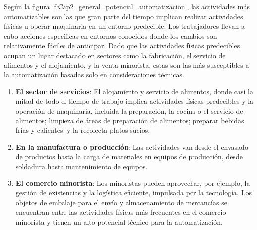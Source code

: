     Según la figura \ref{f:Cap2_general_potencial_automatizacion}, las actividades más automatizables son las que gran parte del tiempo implican realizar actividades físicas u operar maquinaria en un entorno predecible. Los trabajadores llevan a cabo acciones específicas en entornos conocidos donde los cambios son relativamente fáciles de anticipar. Dado que las actividades físicas predecibles ocupan un lugar destacado en sectores como la fabricación, el servicio de alimentos y el alojamiento, y la venta minorista, estas son las más susceptibles a la automatización basadas solo en consideraciones técnicas.
    
    
    \begin{enumerate}
        \item \textbf{El sector de servicios}: El alojamiento y servicio de alimentos, donde casi la mitad de todo el tiempo de trabajo implica actividades físicas predecibles y la operación de maquinaria, incluida la preparación, la cocina o el servicio de alimentos; limpieza de áreas de preparación de alimentos; preparar bebidas frías y calientes; y la recolecta platos sucios. 
        \item \textbf{En la manufactura o producción}: Las actividades van desde el envasado de productos hasta la carga de materiales en equipos de producción, desde soldadura hasta mantenimiento de equipos.
        \item \textbf{El comercio minorista}: Los minoristas pueden aprovechar, por ejemplo, la gestión de existencias y la logística eficiente, impulsada por la tecnología. Los objetos de embalaje para el envío y almacenamiento de mercancías se encuentran entre las actividades físicas más frecuentes en el comercio minorista y tienen un alto potencial técnico para la automatización.
    \end{enumerate}

